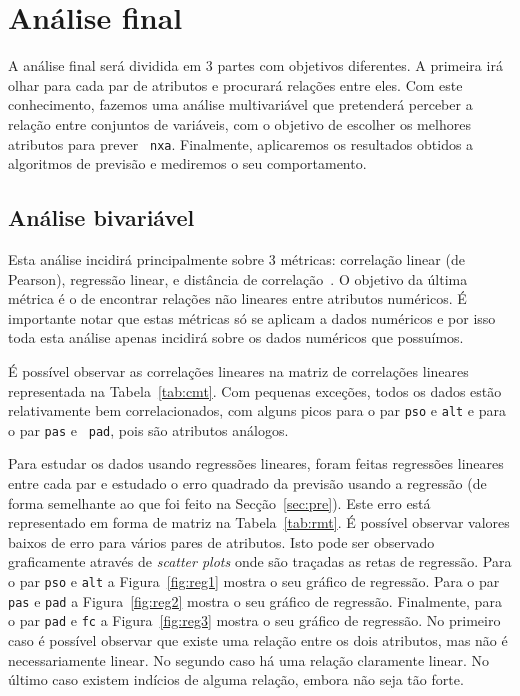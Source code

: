 \documentclass[10pt, conference, compsocconf]{IEEEtran}
\begin{document}

\section{Análise final}
\label{sec:afn}

A análise final será dividida em 3 partes com objetivos diferentes. A
primeira irá olhar para cada par de atributos e procurará relações
entre eles. Com este conhecimento, fazemos uma análise multivariável
que pretenderá perceber a relação entre conjuntos de variáveis, com o
objetivo de escolher os melhores atributos para prever {\tt
  nxa}. Finalmente, aplicaremos os resultados obtidos a algoritmos de
previsão e mediremos o seu comportamento.


\subsection{Análise bivariável}
Esta análise incidirá principalmente sobre 3 métricas: correlação
linear (de Pearson), regressão linear, e distância de
correlação~\cite{szekely2007measuring}. O objetivo da última métrica é
o de encontrar relações não lineares entre atributos numéricos. É
importante notar que estas métricas só se aplicam a dados numéricos e
por isso toda esta análise apenas incidirá sobre os dados numéricos
que possuímos.

É possível observar as correlações lineares na matriz de correlações
lineares representada na Tabela~\ref{tab:cmt}. Com pequenas exceções,
todos os dados estão relativamente bem correlacionados, com alguns
picos para o par {\tt pso} e {\tt alt} e para o par {\tt pas} e {\tt
  pad}, pois são atributos análogos.

Para estudar os dados usando regressões lineares, foram feitas
regressões lineares entre cada par e estudado o erro quadrado da
previsão usando a regressão (de forma semelhante ao que foi feito na
Secção~\ref{sec:pre}). Este erro está representado em forma de matriz
na Tabela~\ref{tab:rmt}. É possível observar valores baixos de erro para
vários pares de atributos. Isto pode ser observado graficamente
através de \textit{scatter plots} onde são traçadas as retas de
regressão. Para o par {\tt pso} e {\tt alt} a Figura~\ref{fig:reg1}
mostra o seu gráfico de regressão. Para o par {\tt pas} e {\tt pad} a
Figura~\ref{fig:reg2} mostra o seu gráfico de regressão. Finalmente,
para o par {\tt pad} e {\tt fc} a Figura~\ref{fig:reg3} mostra o seu
gráfico de regressão. No primeiro caso é possível observar que existe
uma relação entre os dois atributos, mas não é necessariamente
linear. No segundo caso há uma relação claramente linear. No último
caso existem indícios de alguma relação, embora não seja tão forte.
\end{document}
